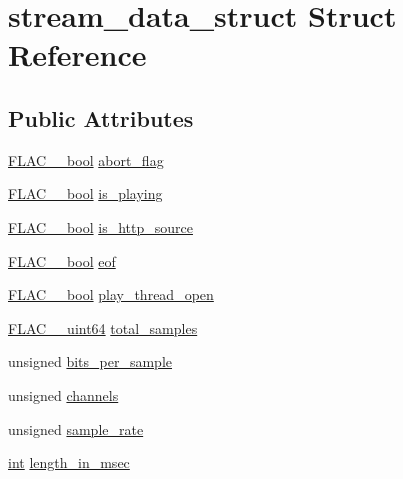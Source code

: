 \hypertarget{structstream__data__struct}{}\section{stream\+\_\+data\+\_\+struct Struct Reference}
\label{structstream__data__struct}
\subsection*{Public Attributes}
\begin{DoxyCompactItemize}
\item 
\hyperlink{ordinals_8h_a95103469f1cbd78b8cf250194985b34e}{F\+L\+A\+C\+\_\+\+\_\+bool} \hyperlink{structstream__data__struct_af1f73ee70c6f8fedf9c081578c369685}{abort\+\_\+flag}
\item 
\hyperlink{ordinals_8h_a95103469f1cbd78b8cf250194985b34e}{F\+L\+A\+C\+\_\+\+\_\+bool} \hyperlink{structstream__data__struct_ae9874f0cfb433c062efeb7e5e08d83ad}{is\+\_\+playing}
\item 
\hyperlink{ordinals_8h_a95103469f1cbd78b8cf250194985b34e}{F\+L\+A\+C\+\_\+\+\_\+bool} \hyperlink{structstream__data__struct_a03a59d7e7e72f590e7676ae64d14f05f}{is\+\_\+http\+\_\+source}
\item 
\hyperlink{ordinals_8h_a95103469f1cbd78b8cf250194985b34e}{F\+L\+A\+C\+\_\+\+\_\+bool} \hyperlink{structstream__data__struct_a47edd81831ed2bd8d59b97c4f11cdbc0}{eof}
\item 
\hyperlink{ordinals_8h_a95103469f1cbd78b8cf250194985b34e}{F\+L\+A\+C\+\_\+\+\_\+bool} \hyperlink{structstream__data__struct_a7162970cc76e24bce7bebf887780d551}{play\+\_\+thread\+\_\+open}
\item 
\hyperlink{ordinals_8h_aa78c8c70a3eb8a58af7436f278acde8e}{F\+L\+A\+C\+\_\+\+\_\+uint64} \hyperlink{structstream__data__struct_adf1b0c5fcc786097d2f1b50230d44156}{total\+\_\+samples}
\item 
unsigned \hyperlink{structstream__data__struct_aa4d853bc144d62409081e98bfdbd4c4d}{bits\+\_\+per\+\_\+sample}
\item 
unsigned \hyperlink{structstream__data__struct_a409d6e47e9e3d835964cf21d6ae76c9c}{channels}
\item 
unsigned \hyperlink{structstream__data__struct_a9dd82b2fb78b3514f8356c8c4b71914d}{sample\+\_\+rate}
\item 
\hyperlink{xmltok_8h_a5a0d4a5641ce434f1d23533f2b2e6653}{int} \hyperlink{structstream__data__struct_a7970cc398a03978690532fa133411c06}{length\+\_\+in\+\_\+msec}

\end{DoxyCompactItemize}
